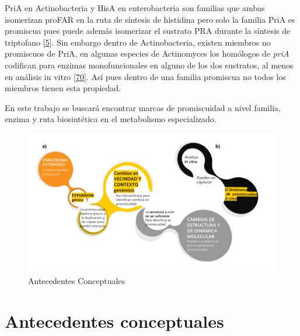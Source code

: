 \documentclass[12pt,twoside]{reedthesis}
\begin{document}
  PriA en Actinobacteria y HisA en enterobacteria son familias que ambas
  isomerizan proFAR en la ruta de síntesis de histidina pero solo la
  familia PriA es promiscua pues puede además isomerizar el sustrato PRA
  durante la síntesis de triptofano
  {[}\protect\hyperlink{ref-baronagomez_occurrence_2003}{5}{]}. Sin
  embargo dentro de Actinobacteria, existen miembros no promiscuos de
  PriA, en algunas especies de Actinomyces los homólogos de \emph{priA}
  codifican para enzimas monofuncionales en alguno de los dos sustratos,
  al menos en análisis in vitro
  {[}\protect\hyperlink{ref-juarez-vazquez_evolution_2017}{70}{]}. Así
  pues dentro de una familia promiscua no todos los miembros tienen esta
  propiedad.
  
  En este trabajo se buscará encontrar marcas de promiscuidad a nivel
  familia, enzima y ruta biosintética en el metabolismo especializado.
  
  \begin{figure}[h!tbp]
  \centering
  \includegraphics[angle = 0,scale = 0.5]{chapter0/AntecedentesConceptuales.png}
  \caption[Antecedentes Conceptuales]{\normalsize{Antecedentes Conceptuales}}
  \label{fig:Antecedentes conceptuales de promiscuidad}
  \end{figure}
  
  \nocite{@carbonell_molecular_2010,@juarez-vazquez_evolution_2017,@noda_tesis_2012,@soskine_mutational_2010,@aharoni_evolvability_2005,@bloom_neutral_2007,@zhao__function_prediction_neighbourhood_2014,@juarez-vazquez_evolution_2017,@martinez-nunez_lifestyle_2015,@zou_evolution_2015, @gatti-lafranconi_flexibility_2013}
  
  \section{Antecedentes conceptuales}\label{antecedentes-conceptuales}
  
\end{document}
